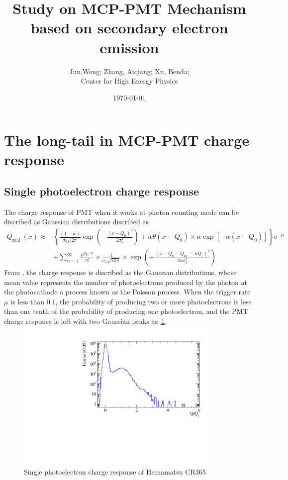 \documentclass{article}
\title{Study on MCP-PMT Mechanism based on secondary electron emission}
\author{Jun,Weng; Zhang, Aiqiang; Xu, Benda; \\ Center for High Energy Physics}
\date{\today}
\begin{document}
\maketitle
\section{The long-tail in MCP-PMT charge response }\label{sec:long-tail}
\subsection{Single photoelectron charge response}\label{subsec:statistical}
The charge response of PMT when it works at photon counting mode can be discribed as Gaussian distributions discribed as ~\cite{1994Absolute}
\begin{equation}
    \begin{aligned}
        Q_{\text {real }}(x) \approx & \left \{\frac{(1-w)}{\sigma_0 \sqrt{2 \pi}} \exp \left(-\frac{\left(x-Q_0\right)^2}{2 \sigma_0^2}\right)+w \theta\left(x-Q_0\right) \times \alpha \exp \left[-\alpha\left(x-Q_0\right)\right]\right\} \mathrm{e}^{-\mu}\\
        &+\sum_{n=1}^{\infty} \frac{\mu^n \mathrm{e}^{-\mu}}{n !}  \times \frac{1}{\sigma_1 \sqrt{2 \pi n}}  \times \exp \left(-\frac{\left(x-Q_0-Q_{\text {sh }}-n Q_1\right)^2}{2 n \sigma_1^2}\right)
    \end{aligned}
    \label{eq:sreal}
\end{equation}
From , the charge response is discribed as the Gaussian distributions, whose mean value represents the number of photoelectrons produced by the photon at the photocathode a process known as the Poisson process.
When the trigger rate $\mu$ is less than 0.1, the probability of producing two or more photoelectrons is less than one tenth of the probability 
of producing one photoelectron, and the PMT charge response is left with two Gaussian peaks as~\ref{fig:spe_sreal}.
\begin{figure}[ht]
    \centering
    \includegraphics[height=7cm]{pic/siglepe.pdf}
    \caption{Single photoelectron charge response of Hamamatsu CR365}\label{fig:spe_sreal}
\end{figure}
\end{document}
